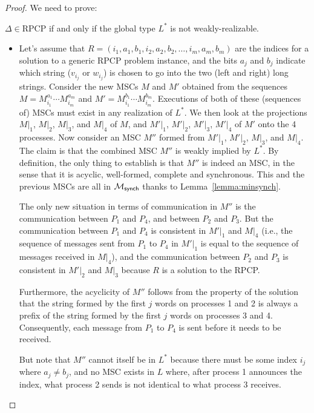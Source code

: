 \begin{proof}
We need to prove:
\begin{center}
$\Delta \in \text{RPCP}$ if and only if the global type $L^*$ is not weakly-realizable.
\end{center}

\begin{itemize}

  \item[$\Rightarrow$] Let's assume that
  $R = (i_1, a_1, b_1, i_2, a_2, b_2, \ldots, i_m, a_m, b_m)$ are the indices
  for a solution to a generic RPCP problem instance, and the bits $a_j$ and 
  $b_j$ indicate which string ($v_{i_j}$ or $w_{i_j}$) is chosen to go into 
  the two (left and right)
  long strings. Consider the new MSCs $M$ and $M'$ obtained from the sequences
  $M = M^{a_1}_{i_1} \cdots M^{a_m}_{i_m}$ and $M' = M^{b_1}_{i_1} \cdots M^{b_m}_{i_m}$.
  Executions of both of these (sequences of) MSCs must exist in any
  realization of $L^*$. We then look at the projections $M|_1$, $M|_2$, $M|_3$,
  and $M|_4$ of $M$, and $M'|_1$, $M'|_2$, $M'|_3$, $M'|_4$ of $M'$ onto the
  4 processes. Now consider an MSC $M''$ formed from $M'|_1$, $M'|_2$,
  $M|_3$, and $M|_4$. The claim is that the combined MSC $M''$ is weakly
  implied by $L^*$. By definition, the only thing to establish is that $M''$
  is indeed an MSC, in the sense that it is acyclic, well-formed, complete
  and synchronous. This and the previous MSCs are all in
  $\mathcal{M}_{\mathsf{synch}}$ thanks to Lemma~\ref{lemma:minsynch}.

  The only new situation in terms of communication in $M''$ is the
  communication between $P_1$ and $P_4$, and between $P_2$ and $P_3$.
  But the communication between $P_1$ and $P_4$ is consistent in
  $M'|_1$ and $M|_4$ (i.e., the sequence of messages sent from $P_1$ to
  $P_4$ in $M'|_1$ is equal to the sequence of messages received in $M|_4$),
  and the communication between $P_2$ and $P_3$ is consistent in
  $M'|_2$ and $M|_3$ because $R$ is a solution to the RPCP.

  Furthermore, the acyclicity of $M''$ follows from the property of the
  solution that the string formed by the first $j$ words on processes 1
  and 2 is always a prefix of the string formed by the first $j$ words
  on processes 3 and 4. Consequently, each message from $P_1$ to $P_4$
  is sent before it needs to be received.

  But note that $M''$ cannot itself be in $L^*$ because there must be
  some index $i_j$ where $a_j \neq b_j$, and no MSC exists in $L$ where,
  after process 1 announces the index, what process 2 sends is not
  identical to what process 3 receives.


\end{itemize}
\end{proof}
